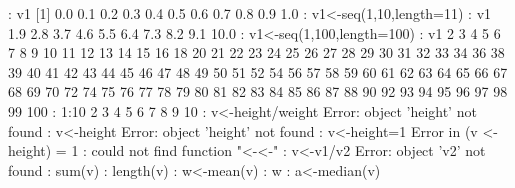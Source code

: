 \documentclass[a4paper,12pt]{article}
\begin{document}
{{: v1
[1] 0.0 0.1 0.2 0.3 0.4 0.5 0.6 0.7 0.8 0.9 1.0
\newline
: v1<-seq(1,10,length=11)
\newline
: v1
  1.9  2.8  3.7  4.6  5.5  6.4  7.3  8.2  9.1 10.0
\newline
: v1<-seq(1,100,length=100)
\newline
: v1
   2   3   4   5   6   7   8   9  10  11  12  13  14  15  16    18
  20  21  22  23  24  25  26  27  28  29  30  31  32  33  34    36
  38  39  40  41  42  43  44  45  46  47  48  49  50  51  52    54
  56  57  58  59  60  61  62  63  64  65  66  67  68  69  70    72
  74  75  76  77  78  79  80  81  82  83  84  85  86  87  88    90
  92  93  94  95  96  97  98  99 100
\newline
: 1:10
  2  3  4  5  6  7  8  9 10
\newline
: v<-height/weight
\newline
Error: object 'height' not found
\newline
: v<-height
\newline
Error: object 'height' not found
\newline
: v<-height=1
\newline
Error in (v <- height) = 1 : could not find function "<-<-"
\newline
: v<-v1/v2
\newline
Error: object 'v2' not found
\newline
: sum(v)
\newline
: length(v)
\newline
: w<-mean(v)
\newline
: w
\newline
: a<-median(v)
\newline
}}
\end{document}

